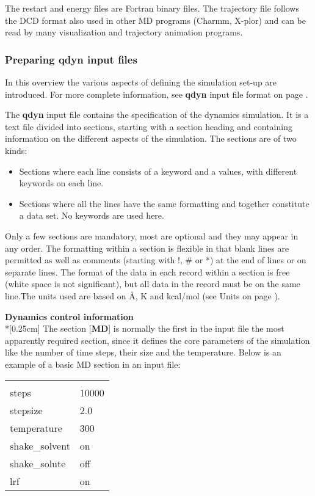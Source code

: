 \documentclass[a4paper,10pt]{article}
\begin{document}
The restart and energy files are Fortran binary files. The
trajectory file follows the DCD format also used in other MD
programs (Charmm, X-plor) and can be read by many visualization
and trajectory animation programs.

\subsubsection{Preparing \textbf{qdyn} input files}\label{subsubsec:prep_qdyn_inp_f}
In this overview the various aspects of defining the simulation
set-up are introduced. For more complete information, see \textbf{qdyn}
input file format on page \pageref{subsubsec:qdyn_inp_file_form}.

The \textbf{qdyn} input file contains the specification of the dynamics
simulation. It is a text file divided into sections, starting with
a section heading and containing information on the different
aspects of the simulation. The sections are of two kinds:

\begin{itemize}
\item Sections where each line consists of a keyword and a values, with
different keywords on each line.
\item Sections where all the lines
have the same formatting and together constitute a data set. No
keywords are used here.
\end{itemize}

Only a few sections are mandatory, most are optional and they may
appear in any order. The formatting within a section is flexible
in that blank lines are permitted as well as comments (starting
with !, {\#} or *) at the end of lines or on separate lines. The
format of the data in each record within a section is free (white
space is not significant), but all data in the record must be on
the same line.The units used are based on {\AA}, K and kcal/mol
(see Units on page \pageref{subsec:units}).

\bigskip
\textbf{Dynamics control information}\\*[0.25cm] The section
[\textbf{MD}] is normally the first in the input file the most
apparently required section, since it defines the core parameters
of the simulation like the number of time steps, their size and
the temperature. Below is an example of a basic MD section in an
input file:

\begin{center}
\begin{tabularx}{\textwidth}{|l X|}
  \hline
  [MD]             & \\
  steps            & 10000 \\
  stepsize         & 2.0 \\
  temperature      & 300 \\
  shake{\_}solvent & on \\
  shake{\_}solute  & off \\
  lrf              & on \\ \hline
\end{tabularx}
\end{center}
\end{document}
